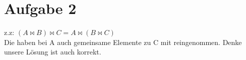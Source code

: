 \section*{Aufgabe 2}
z.z: $ (A\Join B)\Join C = A \Join (B \Join C) $ \\
Die haben bei A auch gemeinsame Elemente zu C mit reingenommen. Denke unsere Lösung ist auch korrekt.
